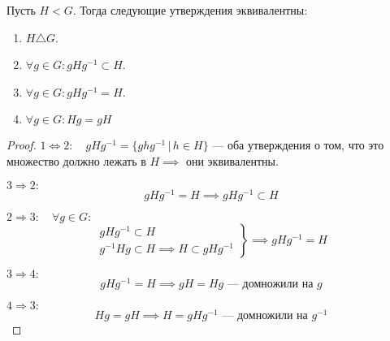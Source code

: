 \documentclass[../main.tex]{subfiles}
\begin{document}
\begin{theorem-non}
    Пусть $H < G$. Тогда следующие утверждения эквивалентны:
    \begin{enumerate}
        \item $H \triangle G$.
        \item $\forall g \in G\colon gHg^{-1} \subset H$.
        \item $\forall g \in G\colon gHg^{-1} = H$.
        \item $\forall g \in G\colon Hg = gH$
     \end{enumerate}
\end{theorem-non}
\begin{proof}
    $1 \Leftrightarrow 2\colon \quad gHg^{-1} = \{ghg^{-1} \, | \, h \in H\}$ --- оба утверждения о том, что это множество должно лежать в $H \implies$ они эквивалентны.

    $3 \Rightarrow 2\colon$
    \begin{equation*}
        gHg^{-1} = H \implies gHg^{-1} \subset H
    \end{equation*}

    $2 \Rightarrow 3\colon \quad \forall g \in G\colon$
    \begin{equation*}
        \left.
        \begin{gathered}
            gHg^{-1} \subset H \\
            g^{-1}Hg \subset H \implies H \subset gHg^{-1}
        \end{gathered}
        \right \}
        \implies gHg^{-1} = H
    \end{equation*}

    $3 \Rightarrow 4\colon$
    \begin{equation*}
        gHg^{-1} = H \implies gH = Hg\text{ --- домножили на $g$}
    \end{equation*}

    $4 \Rightarrow 3\colon$
    \begin{equation*}
        Hg = gH \implies H = gHg^{-1}\text{ --- домножили на $g^{-1}$}
    \end{equation*}
\end{proof}
\end{document}
